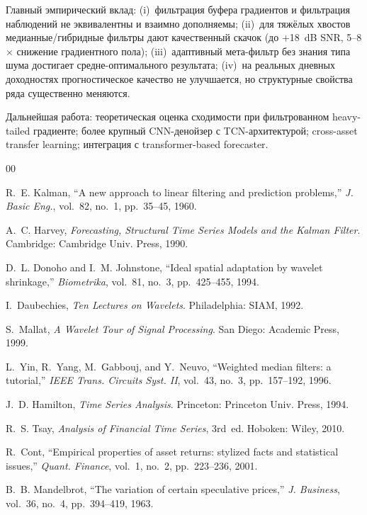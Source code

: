 \documentclass[conference]{IEEEtran}
\begin{document}
Главный эмпирический вклад: (i)~фильтрация буфера градиентов и
фильтрация наблюдений не эквивалентны и взаимно дополняемы; (ii)~для
тяжёлых хвостов медианные/гибридные фильтры дают качественный скачок
(до +18~dB SNR, 5--8$\times$ снижение градиентного пола);
(iii)~адаптивный мета-фильтр без знания типа шума достигает
средне-оптимального результата; (iv)~на реальных дневных доходностях
прогностическое качество не улучшается, но структурные свойства ряда
существенно меняются.

Дальнейшая работа: теоретическая оценка сходимости при фильтрованном
heavy-tailed градиенте; более крупный CNN-денойзер с TCN-архитектурой;
cross-asset transfer learning; интеграция с transformer-based forecaster.

\begin{thebibliography}{00}

R.~E. Kalman, ``A new approach to linear filtering and prediction problems,''
\textit{J. Basic Eng.}, vol.~82, no.~1, pp.~35--45, 1960.

A.~C. Harvey, \textit{Forecasting, Structural Time Series Models and the
Kalman Filter}. Cambridge: Cambridge Univ. Press, 1990.

D.~L. Donoho and I.~M. Johnstone, ``Ideal spatial adaptation by wavelet
shrinkage,'' \textit{Biometrika}, vol.~81, no.~3, pp.~425--455, 1994.

I.~Daubechies, \textit{Ten Lectures on Wavelets}. Philadelphia: SIAM, 1992.

S.~Mallat, \textit{A Wavelet Tour of Signal Processing}. San Diego: Academic
Press, 1999.

L.~Yin, R.~Yang, M.~Gabbouj, and Y.~Neuvo, ``Weighted median filters: a
tutorial,'' \textit{IEEE Trans. Circuits Syst. II}, vol.~43, no.~3,
pp.~157--192, 1996.

J.~D. Hamilton, \textit{Time Series Analysis}. Princeton: Princeton Univ.
Press, 1994.

R.~S. Tsay, \textit{Analysis of Financial Time Series}, 3rd~ed. Hoboken:
Wiley, 2010.

R.~Cont, ``Empirical properties of asset returns: stylized facts and
statistical issues,'' \textit{Quant. Finance}, vol.~1, no.~2,
pp.~223--236, 2001.

B.~B. Mandelbrot, ``The variation of certain speculative prices,''
\textit{J. Business}, vol.~36, no.~4, pp.~394--419, 1963.


\end{thebibliography}
\end{document}
